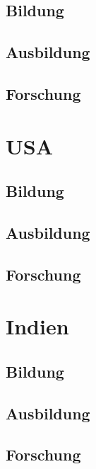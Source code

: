 \subsection{Bildung}
\subsection{Ausbildung}
\subsection{Forschung}

\section{USA}
\subsection{Bildung}
\subsection{Ausbildung}
\subsection{Forschung}

\section{Indien}
\subsection{Bildung}
\subsection{Ausbildung}
\subsection{Forschung}







